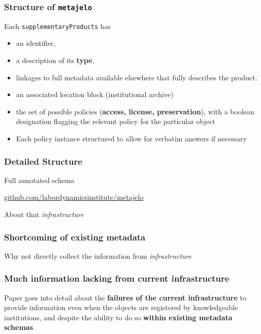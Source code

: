 \begin{frame}
\frametitle{Structure of \texttt{metajelo}}
\begin{block}{Each \texttt{supplementaryProducts} has}
	\begin{itemize}
	\item  an identifier, 
	\item a description of its \textbf{type}, 
	\item linkages to full metadata available elsewhere that fully describes the product.  
	\item an associated location block (institutional archive)
	\item the set of possible policies (\textbf{access, license, preservation}), with a boolean designation flagging the relevant policy for the particular object
	\item Each policy instance structured to allow for verbatim answers if necessary
\end{itemize}
\end{block}
\end{frame}



\begin{frame}
\frametitle{Detailed Structure}
\begin{block}{Full annotated schema}
	
\href{https://github.com/labordynamicsinstitute/metajelo}{github.com/labordynamicsinstitute/metajelo}
\end{block}
\end{frame}



\begin{frame}
\huge About that \textit{\color{MidnightBlue} infrastructure} \textellipsis
\end{frame}


\begin{frame}
\frametitle{Shortcoming of existing metadata}
\begin{block}{Why not directly collect the information from \textit{\color{MidnightBlue} infrastructure}}
	
\end{block}
\end{frame}

\begin{frame}
\frametitle{Much information lacking from current infrastructure}
Paper goes into detail about the \textbf{failures of the current infrastructure} to provide information even when the objects are registered by knowledgeable institutions, and despite the ability to do so \textbf{within existing metadata schemas}.
\end{frame}



